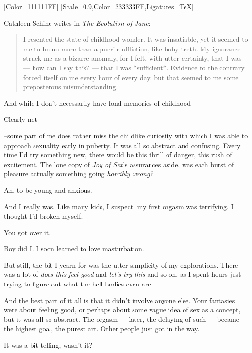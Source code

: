[Color=111111FF]
\renewfontfamily{}[Scale=0.9,Color=333333FF,Ligatures=TeX]

\noindent Cathleen Schine writes in \emph{The Evolution of Jane}:

\begin{quotation}
  I resented the state of childhood wonder.  It was insatiable, yet it seemed to me to be no more than a puerile affliction, like baby teeth.  My ignorance struck me as a bizarre anomaly, for I felt, with utter certainty, that I was --- how can I say this? --- that I was *sufficient*.  Evidence to the contrary forced itself on me every hour of every day, but that seemed to me some preposterous misunderstanding.
\end{quotation}
And while I don't necessarily have fond memories of childhood--

\begin{ally}
Clearly not
\end{ally}
--some part of me does rather miss the childlike curiosity with which I was able to approach sexuality early in puberty. It was all so abstract and confusing. Every time I'd try something new, there would be this thrill of danger, this rush of excitement. The lone copy of \emph{Joy of Sex}'s assurances aside, was each burst of pleasure actually something going \emph{horribly wrong?}

\begin{ally}
Ah, to be young and anxious.
\end{ally}
And I really was. Like many kids, I suspect, my first orgasm was terrifying. I thought I'd broken myself.

\begin{ally}
You got over it.
\end{ally}
Boy did I. I soon learned to love masturbation.

But still, the bit I yearn for was the utter simplicity of my explorations. There was a lot of \emph{does this feel good} and \emph{let's try this} and so on, as I spent hours just trying to figure out what the hell bodies even are.

\begin{ally}
And the best part of it all is that it didn't involve anyone else. Your fantasies were about feeling good, or perhaps about some vague idea of sex as a concept, but it was all so abstract. The orgasm --- later, the delaying of such --- became the highest goal, the purest art. Other people just got in the way.
\end{ally}
It was a bit telling, wasn't it?
\newpage

